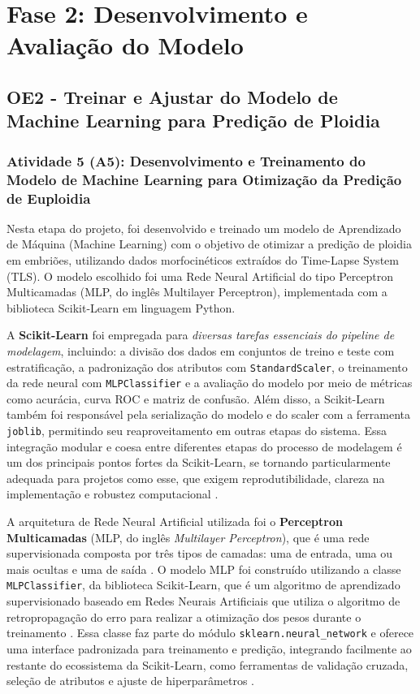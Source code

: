 \section{Fase 2: Desenvolvimento e Avaliação do Modelo}
\subsection{OE2 - Treinar e Ajustar do Modelo de Machine Learning para Predição de Ploidia}
\subsubsection{Atividade 5 (A5): Desenvolvimento e Treinamento do Modelo de Machine Learning para Otimização da Predição de Euploidia}
Nesta etapa do projeto, foi desenvolvido e treinado um modelo de Aprendizado de Máquina (Machine Learning) com o objetivo de otimizar a predição de ploidia em embriões, utilizando dados morfocinéticos extraídos do Time-Lapse System (TLS). O modelo escolhido foi uma Rede Neural Artificial do tipo Perceptron Multicamadas (MLP, do inglês Multilayer Perceptron), implementada com a biblioteca Scikit-Learn em linguagem Python.

A \textbf{Scikit-Learn} foi empregada para \textit{diversas tarefas essenciais do pipeline de modelagem}, incluindo: a divisão dos dados em conjuntos de treino e teste com estratificação, a padronização dos atributos com \texttt{StandardScaler}, o treinamento da rede neural com \texttt{MLPClassifier} e a avaliação do modelo por meio de métricas como acurácia, curva ROC e matriz de confusão. Além disso, a Scikit-Learn também foi responsável pela serialização do modelo e do scaler com a ferramenta \texttt{joblib}, permitindo seu reaproveitamento em outras etapas do sistema. Essa integração modular e coesa entre diferentes etapas do processo de modelagem é um dos principais pontos fortes da Scikit-Learn, se tornando particularmente adequada para projetos como esse, que exigem reprodutibilidade, clareza na implementação e robustez computacional \cite{geron2017}.

A arquitetura de Rede Neural Artificial utilizada foi o \textbf{Perceptron Multicamadas} (MLP, do inglês \textit{Multilayer Perceptron}), que é uma rede supervisionada composta por três tipos de camadas: uma de entrada, uma ou mais ocultas e uma de saída \cite{haykin2009}. O modelo MLP foi construído utilizando a classe \texttt{MLPClassifier}, da biblioteca Scikit-Learn, que é um algoritmo de aprendizado supervisionado baseado em Redes Neurais Artificiais que utiliza o algoritmo de retropropagação do erro para realizar a otimização dos pesos durante o treinamento \cite{geron2017}.  Essa classe faz parte do módulo \texttt{sklearn.neural\_network} e oferece uma interface padronizada para treinamento e predição, integrando facilmente ao restante do ecossistema da Scikit-Learn, como ferramentas de validação cruzada, seleção de atributos e ajuste de hiperparâmetros \cite{geron2017}. 

